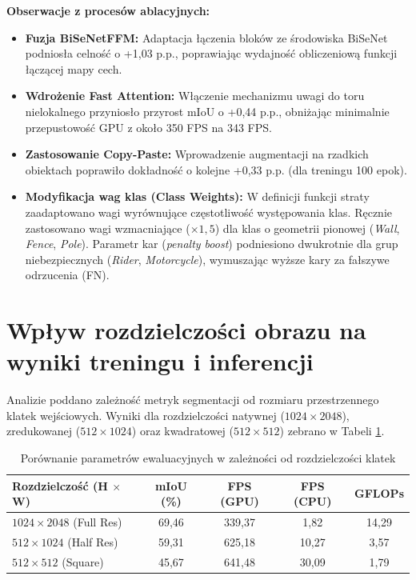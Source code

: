 \textbf{Obserwacje z procesów ablacyjnych:}
\begin{itemize}
    \item \textbf{Fuzja BiSeNetFFM:} Adaptacja łączenia bloków ze środowiska BiSeNet podniosła celność o +1,03 p.p., poprawiając wydajność obliczeniową funkcji łączącej mapy cech.
    \item \textbf{Wdrożenie Fast Attention:} Włączenie mechanizmu uwagi do toru nielokalnego przyniosło przyrost mIoU o +0,44 p.p., obniżając minimalnie przepustowość GPU z około 350 FPS na 343 FPS.
    \item \textbf{Zastosowanie Copy-Paste:} Wprowadzenie augmentacji na rzadkich obiektach poprawiło dokładność o kolejne +0,33 p.p. (dla treningu 100 epok).
    \item \textbf{Modyfikacja wag klas (Class Weights):} W definicji funkcji straty zaadaptowano wagi wyrównujące częstotliwość występowania klas. Ręcznie zastosowano wagi wzmacniające ($\times 1,5$) dla klas o geometrii pionowej (\textit{Wall}, \textit{Fence}, \textit{Pole}). Parametr kar (\textit{penalty boost}) podniesiono dwukrotnie dla grup niebezpiecznych (\textit{Rider}, \textit{Motorcycle}), wymuszając wyższe kary za fałszywe odrzucenia (FN).
\end{itemize}

\section{Wpływ rozdzielczości obrazu na wyniki treningu i inferencji}
Analizie poddano zależność metryk segmentacji od rozmiaru przestrzennego klatek wejściowych. Wyniki dla rozdzielczości natywnej ($1024 \times 2048$), zredukowanej ($512 \times 1024$) oraz kwadratowej ($512 \times 512$) zebrano w Tabeli \ref{tab:rozdzielczosci}.

\begin{table}[htbp]
\centering
\caption{Porównanie parametrów ewaluacyjnych w zależności od rozdzielczości klatek}
\label{tab:rozdzielczosci}
\begin{tabular}{|l|c|c|c|c|}
\hline
\textbf{Rozdzielczość (H $\times$ W)} & \textbf{mIoU (\%)} & \textbf{FPS (GPU)} & \textbf{FPS (CPU)} & \textbf{GFLOPs} \\ \hline
$1024 \times 2048$ (Full Res) & 69,46 & 339,37 & 1,82 & 14,29 \\ \hline
$512 \times 1024$ (Half Res) & 59,31 & 625,18 & 10,27 & 3,57 \\ \hline
$512 \times 512$ (Square) & 45,67 & 641,48 & 30,09 & 1,79 \\ \hline
\end{tabular}
\end{table}

